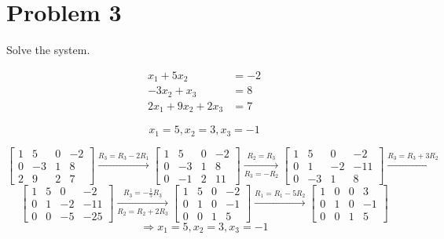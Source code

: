\documentclass[letter,11pt]{article}
\begin{document}
\section{Problem 3} Solve the system.

\begin{align*}
x_{1}+5 x_{2} & =-2 \\
-3 x_{2}+x_{3} & =8 \\
2 x_{1}+9 x_{2}+2 x_{3} & =7
\end{align*}

\begin{tcolorbox}[boxrule=1mm, width=(.9\linewidth),before=\hfill,after=\hfill, adjusted title={Problem 3 Solution}]
$$x_1=5,x_2=3,x_3=-1$$
\tcblower

$$\begin{bmatrix}
1 & 5 & 0 & -2 \\
0 & -3 & 1 & 8 \\
2 & 9 & 2 & 7
\end{bmatrix} \xrightarrow{R_3 = R_3 -2R_1}
\begin{bmatrix}
1 & 5 & 0 & -2 \\
0 & -3 & 1 & 8 \\
0 & -1 & 2 & 11
\end{bmatrix} \xrightarrow[R_3=-R_2]{R_2 = R_3}
\begin{bmatrix}
1 & 5 & 0 & -2 \\
0 & 1 & -2 & -11 \\
0 & -3 & 1 & 8
\end{bmatrix}\xrightarrow{R_3 = R_3 +3R_2}$$
$$\begin{bmatrix}
1 & 5 & 0 & -2 \\
0 & 1 & -2 & -11 \\
0 & 0 & -5 & -25
\end{bmatrix}\xrightarrow[R_2=R_2+2R_3]{R_3 = -\frac{1}{5}R_3}
\begin{bmatrix}
1 & 5 & 0 & -2 \\
0 & 1 & 0 & -1 \\
0 & 0 & 1 & 5
\end{bmatrix}\xrightarrow{R_1=R_1-5R_2}
\begin{bmatrix}
1 & 0 & 0 & 3 \\
0 & 1 & 0 & -1 \\
0 & 0 & 1 & 5
\end{bmatrix}$$ 
$$\Longrightarrow  x_{1}=5, x_{2}=3, x_{3}=-1$$
\end{tcolorbox}
\newpage
\end{document}
